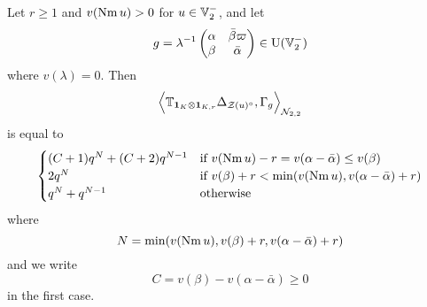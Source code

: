 \begin{theorem}
  \label{thm:clean_intersection}
  Let $r \ge 1$ and $v(\operatorname{Nm} u) > 0$ for $u \in \mathbb V_2^-$, and let
  \[ g = \lambda^{-1}
    \begin{pmatrix} \alpha & \bar\beta \varpi \\ \beta & \bar\alpha \end{pmatrix}
    \in \operatorname{U}(\mathbb V_2^-) \]
  where $v(\lambda) = 0$.
  Then
  \[ \Big\langle \mathbb{T}_{\mathbf{1}_K \otimes \mathbf{1}_{K, r}}
    \Delta_{\mathcal Z(u)^\circ}, \Gamma_g \Big\rangle_{\mathcal N_{2,2}} \]
  is equal to
  \[
    \begin{cases}
      (C+1) q^{N} + (C+2) q^{N-1}
        & \text{if } v(\operatorname{Nm} u)-r = v(\alpha - \bar\alpha) \le v(\beta) \\
      2q^N & \text{if } v(\beta) + r < \min(v(\operatorname{Nm} u), v(\alpha - \bar\alpha) + r) \\
      q^N + q^{N-1} & \text{otherwise}
    \end{cases}
  \]
  where
  \[ N = \min(v(\operatorname{Nm} u), v(\beta) + r, v(\alpha-\bar\alpha) + r) \]
  and we write
  \[ C = v(\beta) - v(\alpha - \bar\alpha) \ge 0 \]
  in the first case.
\end{theorem}

